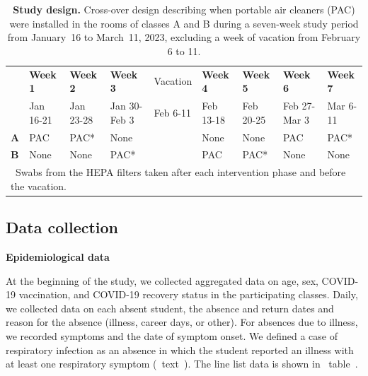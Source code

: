 \documentclass[fleqn,11pt]{wlscirep}
\begin{document}
\begin{table}[!htpb]
    \footnotesize
    \centering
    \caption{\textbf{Study design.} Cross-over design describing when portable air cleaners (PAC) were installed in the rooms of classes A and B during a seven-week study period from January~16 to March~11, 2023, excluding a week of vacation from February 6 to 11.}\label{tab:study_design}
    \begin{tabular}{l l l l l l l l l}
    \toprule
      & \textbf{Week 1} & \textbf{Week 2} & \textbf{Week 3} & Vacation & \textbf{Week 4} & \textbf{Week 5} & \textbf{Week 6} & \textbf{Week 7} \\
      & Jan 16-21 & Jan 23-28 & Jan 30-Feb 3 & Feb 6-11 & Feb 13-18 & Feb 20-25 & Feb 27-Mar 3 & Mar 6-11 \\
      \midrule
      \textbf{A} & \cellcolor{gray!50} PAC & \cellcolor{gray!50} PAC\hphantom{000}*& \cellcolor{gray!10} None & & \cellcolor{gray!10} None & \cellcolor{gray!10} None & \cellcolor{gray!50} PAC & \cellcolor{gray!50} PAC\hphantom{0000}* \\
      \textbf{B} & \cellcolor{gray!10} None & \cellcolor{gray!10} None & \cellcolor{gray!50} PAC\hphantom{00000}* & & \cellcolor{gray!50} PAC & \cellcolor{gray!50} PAC\hphantom{000}*& \cellcolor{gray!10} None & \cellcolor{gray!10} None \\
      \bottomrule
      \multicolumn{9}{l}{\scriptsize *~Swabs from the HEPA filters taken after each intervention phase and before the vacation.}
    \end{tabular}
\end{table}
 
\subsection{Data collection}

\noindent\textbf{Epidemiological data} \smallskip

\noindent At the beginning of the study, we collected aggregated data on age, sex, COVID-19 vaccination, and COVID-19 recovery status in the participating classes. Daily, we collected data on each absent student, \ie the absence and return dates and reason for the absence (illness, career days, or other). For absences due to illness, we recorded symptoms and the date of symptom onset. We defined a case of respiratory infection as an absence in which the student reported an illness with at least one respiratory symptom (\supp~text~). The line list data is shown in \supp~table~. \medskip
\end{document}
